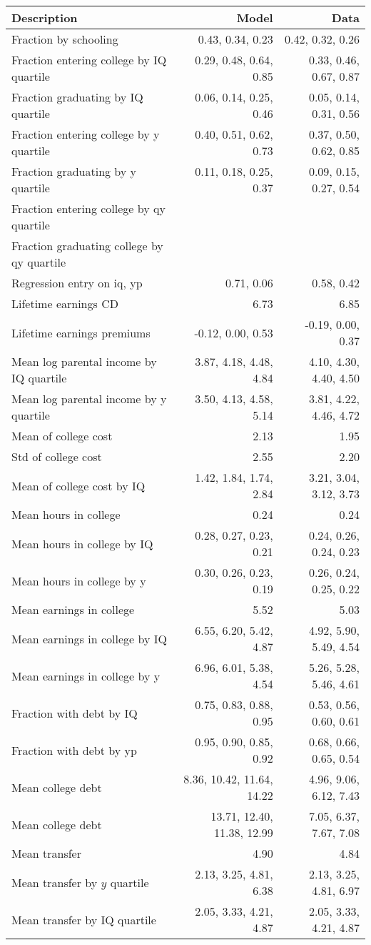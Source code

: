 \begin{tabular}{lrr}
\hline
Description & Model  & Data  \\ 
\hline
Fraction by schooling & 0.43, 0.34, 0.23  & 0.42, 0.32, 0.26  \\ 
Fraction entering college by IQ quartile & 0.29, 0.48, 0.64, 0.85  & 0.33, 0.46, 0.67, 0.87  \\ 
Fraction graduating by IQ quartile & 0.06, 0.14, 0.25, 0.46  & 0.05, 0.14, 0.31, 0.56  \\ 
Fraction entering college by y quartile & 0.40, 0.51, 0.62, 0.73  & 0.37, 0.50, 0.62, 0.85  \\ 
Fraction graduating by y quartile & 0.11, 0.18, 0.25, 0.37  & 0.09, 0.15, 0.27, 0.54  \\ 
Fraction entering college by qy quartile &   &   \\ 
Fraction graduating college by qy quartile &   &   \\ 
Regression entry on iq, yp & 0.71, 0.06  & 0.58, 0.42  \\ 
Lifetime earnings CD & 6.73  & 6.85  \\ 
Lifetime earnings premiums & -0.12, 0.00, 0.53  & -0.19, 0.00, 0.37  \\ 
Mean log parental income by IQ quartile & 3.87, 4.18, 4.48, 4.84  & 4.10, 4.30, 4.40, 4.50  \\ 
Mean log parental income by y quartile & 3.50, 4.13, 4.58, 5.14  & 3.81, 4.22, 4.46, 4.72  \\ 
Mean of college cost & 2.13  & 1.95  \\ 
Std of college cost & 2.55  & 2.20  \\ 
Mean of college cost by IQ & 1.42, 1.84, 1.74, 2.84  & 3.21, 3.04, 3.12, 3.73  \\ 
Mean hours in college & 0.24  & 0.24  \\ 
Mean hours in college by IQ & 0.28, 0.27, 0.23, 0.21  & 0.24, 0.26, 0.24, 0.23  \\ 
Mean hours in college by y & 0.30, 0.26, 0.23, 0.19  & 0.26, 0.24, 0.25, 0.22  \\ 
Mean earnings in college & 5.52  & 5.03  \\ 
Mean earnings in college by IQ & 6.55, 6.20, 5.42, 4.87  & 4.92, 5.90, 5.49, 4.54  \\ 
Mean earnings in college by y & 6.96, 6.01, 5.38, 4.54  & 5.26, 5.28, 5.46, 4.61  \\ 
Fraction with debt by IQ & 0.75, 0.83, 0.88, 0.95  & 0.53, 0.56, 0.60, 0.61  \\ 
Fraction with debt by yp & 0.95, 0.90, 0.85, 0.92  & 0.68, 0.66, 0.65, 0.54  \\ 
Mean college debt & 8.36, 10.42, 11.64, 14.22  & 4.96, 9.06, 6.12, 7.43  \\ 
Mean college debt & 13.71, 12.40, 11.38, 12.99  & 7.05, 6.37, 7.67, 7.08  \\ 
Mean transfer & 4.90  & 4.84  \\ 
Mean transfer by $y$ quartile & 2.13, 3.25, 4.81, 6.38  & 2.13, 3.25, 4.81, 6.97  \\ 
Mean transfer by IQ quartile & 2.05, 3.33, 4.21, 4.87  & 2.05, 3.33, 4.21, 4.87  \\ 
\hline
\end{tabular}%
